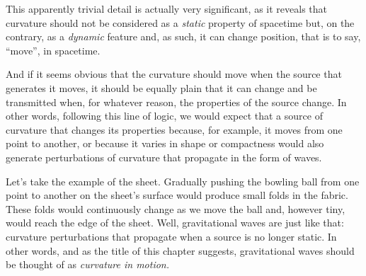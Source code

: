 This apparently trivial detail is actually very significant, as it reveals that
curvature should not be considered as a \emph{static} property of spacetime but, on the
contrary, as a \emph{dynamic} feature and, as such, it can change position, that is to
say, ``move'', in spacetime.

And if it seems obvious that the curvature should move when the source that generates it
moves, it should be equally plain that it can change and be transmitted when, for
whatever reason, the properties of the source change. In other words, following this
line of logic, we would expect that a source of curvature that changes its properties
because, for example, it moves from one point to another, or because it varies in shape
or compactness would also generate perturbations of curvature that propagate in the form
of waves.

Let's take the example of the sheet. Gradually pushing the bowling ball from one point
to another on the sheet's surface would produce small folds in the fabric. These folds
would continuously change as we move the ball and, however tiny, would reach the edge of
the sheet. Well, gravitational waves are just like that: curvature
perturbations that propagate when a source is no longer static. In other words, and as
the title of this chapter suggests, gravitational waves should be thought of as
\emph{curvature in motion.}


